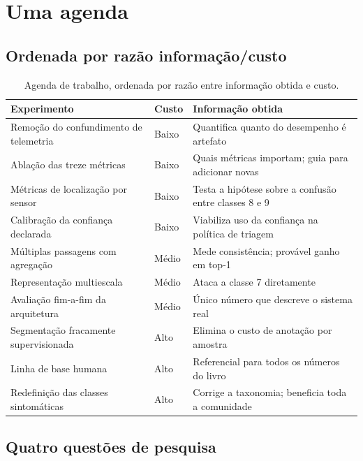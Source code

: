 \section{Uma agenda}

\subsection{Ordenada por razão informação/custo}

\begin{table}[htbp]
\centering
\caption{Agenda de trabalho, ordenada por razão entre informação obtida e custo.}
\label{tab:fut-agenda}
\small
\begin{tabular}{p{5.2cm}p{2.0cm}p{4.8cm}}
\toprule
\textbf{Experimento} & \textbf{Custo} & \textbf{Informação obtida} \\
\midrule
Remoção do confundimento de telemetria & Baixo &
Quantifica quanto do desempenho é artefato \\
\addlinespace
Ablação das treze métricas & Baixo &
Quais métricas importam; guia para adicionar novas \\
\addlinespace
Métricas de localização por sensor & Baixo &
Testa a hipótese sobre a confusão entre classes 8 e 9 \\
\addlinespace
Calibração da confiança declarada & Baixo &
Viabiliza uso da confiança na política de triagem \\
\addlinespace
Múltiplas passagens com agregação & Médio &
Mede consistência; provável ganho em top-1 \\
\addlinespace
Representação multiescala & Médio &
Ataca a classe 7 diretamente \\
\addlinespace
Avaliação fim-a-fim da arquitetura & Médio &
Único número que descreve o sistema real \\
\addlinespace
Segmentação fracamente supervisionada & Alto &
Elimina o custo de anotação por amostra \\
\addlinespace
Linha de base humana & Alto &
Referencial para todos os números do livro \\
\addlinespace
Redefinição das classes sintomáticas & Alto &
Corrige a taxonomia; beneficia toda a comunidade \\
\bottomrule
\end{tabular}
\end{table}

\subsection{Quatro questões de pesquisa}

